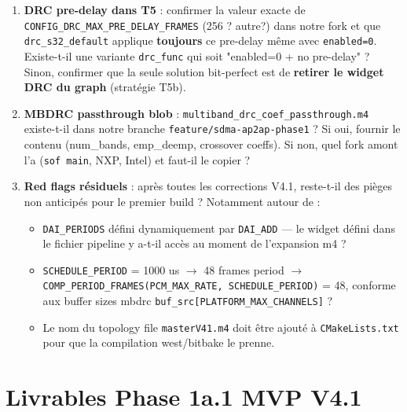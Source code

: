 \documentclass[11pt,a4paper]{article}
\begin{document}
\begin{enumerate}[leftmargin=*, itemsep=2pt]
  \item \textbf{DRC pre-delay dans T5} : confirmer la valeur exacte de \texttt{CONFIG\_DRC\_MAX\_PRE\_DELAY\_FRAMES} (256 ? autre?) dans notre fork et que \texttt{drc\_s32\_default} applique \textbf{toujours} ce pre-delay même avec \texttt{enabled=0}. Existe-t-il une variante \texttt{drc\_func} qui soit "enabled=0 + no pre-delay" ? Sinon, confirmer que la seule solution bit-perfect est de \textbf{retirer le widget DRC du graph} (stratégie T5b).
  \item \textbf{MBDRC passthrough blob} : \texttt{multiband\_drc\_coef\_passthrough.m4} existe-t-il dans notre branche \texttt{feature/sdma-ap2ap-phase1} ? Si oui, fournir le contenu (num\_bands, emp\_deemp, crossover coeffs). Si non, quel fork amont l'a (\texttt{sof main}, NXP, Intel) et faut-il le copier ?
  \item \textbf{Red flags résiduels} : après toutes les corrections V4.1, reste-t-il des pièges non anticipés pour le premier build ? Notamment autour de :
    \begin{itemize}[leftmargin=*]
      \item \texttt{DAI\_PERIODS} défini dynamiquement par \texttt{DAI\_ADD} --- le widget défini dans le fichier pipeline y a-t-il accès au moment de l'expansion m4 ?
      \item \texttt{SCHEDULE\_PERIOD} = 1000 us $\to$ 48 frames period $\to$ \texttt{COMP\_PERIOD\_FRAMES(PCM\_MAX\_RATE, SCHEDULE\_PERIOD)} = 48, conforme aux buffer sizes mbdrc \texttt{buf\_src[PLATFORM\_MAX\_CHANNELS]} ?
      \item Le nom du topology file \texttt{masterV41.m4} doit être ajouté à \texttt{CMakeLists.txt} pour que la compilation west/bitbake le prenne.
    \end{itemize}
\end{enumerate}

\section{Livrables Phase 1a.1 MVP V4.1}
\end{document}
